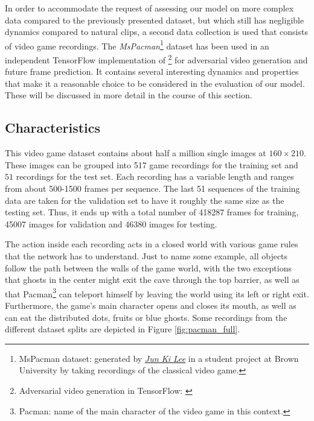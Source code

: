 In order to accommodate the request of assessing our model on more complex data compared to the previously presented dataset, but which still has negligible dynamics compared to natural clips, a second data collection is used that consists of video game recordings. The \textit{MsPacman}\footnote{MsPacman dataset: generated by \href{mailto:jun_ki_lee@brown.edu}{\textit{Jun Ki Lee}} in a student project at Brown University by taking recordings of the classical video game.} dataset has been used in an independent TensorFlow implementation of \parencite{deep_multiscale_video_pred}\footnote{Adversarial video generation in TensorFlow: \parencite{tf_impl_gan}} for adversarial video generation and future frame prediction. It contains several interesting dynamics and properties that make it a reasonable choice to be considered in the evaluation of our model. These will be discussed in more detail in the course of this section.

\subsection{Characteristics}

This video game dataset contains about half a million single images at $ 160 \times 210 $. These images can be grouped into \num{517} game recordings for the training set and $51$ recordings for the test set. Each recording has a variable length and ranges from about \num{500}-\num{1500} frames per sequence. The last \num{51} sequences of the training data are taken for the validation set to have it roughly the same size as the testing set. Thus, it ends up with a total number of \num{418287} frames for training, \num{45007} images for validation and \num{46380} images for testing.

The action inside each recording acts in a closed world with various game rules that the network has to understand. Just to name some example, all objects follow the path between the walls of the game world, with the two exceptions that ghosts in the center might exit the cave through the top barrier, as well as that Pacman\footnote{Pacman: name of the main character of the video game in this context.} can teleport himself by leaving the world using its left or right exit. Furthermore, the game's main character opens and closes its mouth, as well as can eat the distributed dots, fruits or blue ghosts. Some recordings from the different dataset splits are depicted in Figure \ref{fig:pacman_full}.

